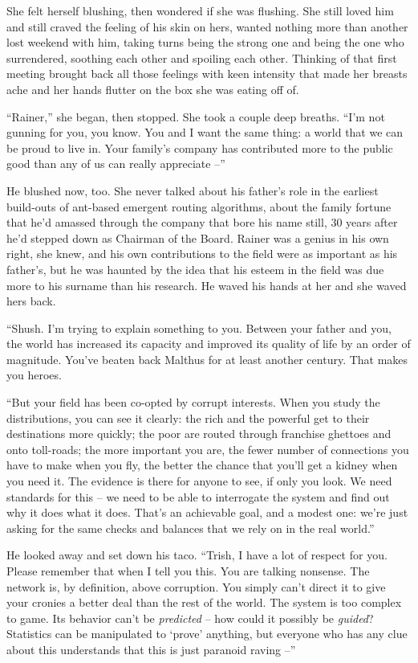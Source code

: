 She felt herself blushing, then wondered if she was flushing. She still 
loved him and still craved the feeling of his skin on hers, wanted 
nothing more than another lost weekend with him, taking turns being the 
strong one and being the one who surrendered, soothing each other and 
spoiling each other. Thinking of that first meeting brought back all 
those feelings with keen intensity that made her breasts ache and her 
hands flutter on the box she was eating off of.

“Rainer,” she began, then stopped. She took a couple deep breaths. 
“I'm not gunning for you, you know. You and I want the same thing: a 
world that we can be proud to live in. Your family's company has 
contributed more to the public good than any of us can really 
appreciate --”

He blushed now, too. She never talked about his father's role in the 
earliest build-outs of ant-based emergent routing algorithms, about the 
family fortune that he'd amassed through the company that bore his name 
still, 30 years after he'd stepped down as Chairman of the Board. 
Rainer was a genius in his own right, she knew, and his own 
contributions to the field were as important as his father's, but he 
was haunted by the idea that his esteem in the field was due more to 
his surname than his research. He waved his hands at her and she waved 
hers back.

“Shush. I'm trying to explain something to you. Between your father 
and you, the world has increased its capacity and improved its quality 
of life by an order of magnitude. You've beaten back Malthus for at 
least another century. That makes you heroes.

“But your field has been co-opted by corrupt interests. When you 
study the distributions, you can see it clearly: the rich and the 
powerful get to their destinations more quickly; the poor are routed 
through franchise ghettoes and onto toll-roads; the more important you 
are, the fewer number of connections you have to make when you fly, the 
better the chance that you'll get a kidney when you need it. The 
evidence is there for anyone to see, if only you look. We need 
standards for this -- we need to be able to interrogate the system and 
find out why it does what it does. That's an achievable goal, and a 
modest one: we're just asking for the same checks and balances that we 
rely on in the real world.”

He looked away and set down his taco. “Trish, I have a lot of respect 
for you. Please remember that when I tell you this. You are talking 
nonsense. The network is, by definition, above corruption. You simply 
can't direct it to give your cronies a better deal than the rest of the 
world. The system is too complex to game. Its behavior can't be 
\emph{predicted} -- how could it possibly be \emph{guided}? Statistics 
can be manipulated to `prove' anything, but everyone who has any clue 
about this understands that this is just paranoid raving --”

